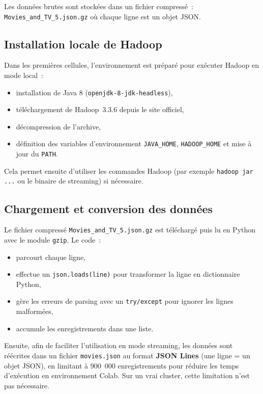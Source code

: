 \documentclass[a4paper,11pt]{article}
\begin{document}
Les données brutes sont stockées dans un fichier compressé~:\\
\texttt{Movies\_and\_TV\_5.json.gz} où chaque ligne est un objet JSON.

\subsection{Installation locale de Hadoop}

Dans les premières cellules, l'environnement est préparé pour
exécuter Hadoop en mode local~:
\begin{itemize}
  \item installation de Java 8 (\texttt{openjdk-8-jdk-headless}),\
  \item téléchargement de Hadoop~3.3.6 depuis le site officiel,\
  \item décompression de l'archive,\
  \item définition des variables d'environnement \texttt{JAVA\_HOME},
        \texttt{HADOOP\_HOME} et mise à jour du \texttt{PATH}.
\end{itemize}

Cela permet ensuite d'utiliser les commandes Hadoop (par exemple
\texttt{hadoop jar ...} ou le binaire de streaming) si nécessaire.

\subsection{Chargement et conversion des données}

Le fichier compressé \texttt{Movies\_and\_TV\_5.json.gz} est téléchargé
puis lu en Python avec le module \texttt{gzip}. Le code~:
\begin{itemize}
  \item parcourt chaque ligne,\
  \item effectue un \texttt{json.loads(line)} pour transformer la ligne
        en dictionnaire Python,\
  \item gère les erreurs de parsing avec un \texttt{try/except} pour
        ignorer les lignes malformées,\
  \item accumule les enregistrements dans une liste.
\end{itemize}

Ensuite, afin de faciliter l'utilisation en mode streaming, les données
sont réécrites dans un fichier \texttt{movies.json} au format
\textbf{JSON Lines} (une ligne = un objet JSON), en limitant à
900~000 enregistrements pour réduire les temps d'exécution en environnement
Colab. Sur un vrai cluster, cette limitation n'est pas nécessaire.
\end{document}
